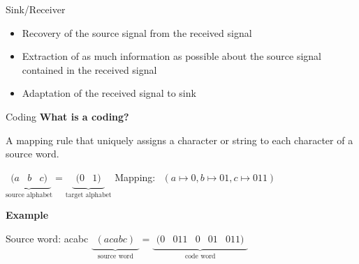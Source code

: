 \documentclass[ngerman]{beamer}
\begin{document}
\begin{frame}{Sink/Receiver}
	\begin{itemize}[label={-}, itemsep=2ex]
	\item Recovery of the source signal from the received signal
	\item Extraction of as much information as possible about the source signal contained in the received signal
	\item Adaptation of the received signal to sink
	\end{itemize} 
\end{frame}



%	

\begin{frame}{Coding}
\textbf{What is a coding?}

A mapping rule that uniquely assigns a character or string to each character of a source word.

$ \underbrace{\begin{matrix} (a & b & c)\end{matrix}}
_\text{source alphabet} = \underbrace{\begin{matrix} (0 & 1)\end{matrix}}_\text{target alphabet}$\newline\newline
Mapping: $ \begin{matrix} (a \mapsto 0, b \mapsto 01, c \mapsto 011)\end{matrix}$

\textbf{Example}

Source word: acabc\newline
$ \underbrace{\begin{matrix} (acabc)\end{matrix}}
_\text{source word} = \underbrace{\begin{matrix} (0 &011 &0 &01 &011)\end{matrix}}_\text{code word}$

\end{frame}


\end{document}
